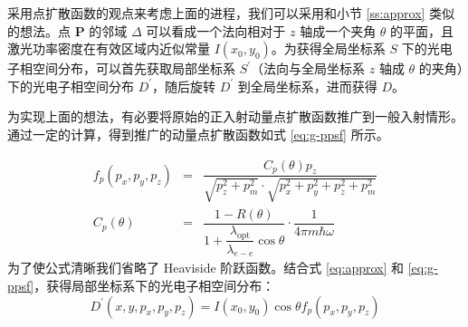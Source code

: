 采用点扩散函数的观点来考虑上面的进程，我们可以采用和小节 \ref{ss:approx} 类似的想法。点 \textbf{P} 的邻域 $\Delta$ 可以看成一个法向相对于 $z$ 轴成一个夹角 $\theta$ 的平面，且激光功率密度在有效区域内近似常量 $I(x_0, y_0)$。为获得全局坐标系 $S$ 下的光电子相空间分布，可以首先获取局部坐标系 $S^{\prime}$（法向与全局坐标系 $z$ 轴成 $\theta$ 的夹角）下的光电子相空间分布 $D^{\prime}$，随后旋转 $D^{\prime}$ 到全局坐标系，进而获得 $D$。

为实现上面的想法，有必要将原始的正入射动量点扩散函数推广到一般入射情形。通过一定的计算，得到推广的动量点扩散函数如式 \ref{eq:g-ppsf} 所示。

\begin{eqnarray}
f_p(p_x,p_y,p_z) &=& \dfrac{C_p(\theta)p_z}{\sqrt{p_z^2+p_m^2}\cdot\sqrt{p_x^2+p_y^2+p_z^2+p_m^2}}\label{eq:g-ppsf}\\
C_p(\theta) &=& \dfrac{1-R(\theta)}{1+\dfrac{\lambda_{\text{opt}}}{\lambda_{e-e}}\cos\theta}\cdot\dfrac{1}{4\pi m\hbar\omega}\nonumber
\end{eqnarray}
为了使公式清晰我们省略了 Heaviside 阶跃函数。结合式 \ref{eq:approx} 和 \ref{eq:g-ppsf}，获得局部坐标系下的光电子相空间分布：
\begin{equation}
D^{\prime}(x, y, p_x, p_y, p_z) = I(x_0,y_0)\cos\theta f_p(p_x, p_y, p_z)
\label{eq:l-dist}
\end{equation}

